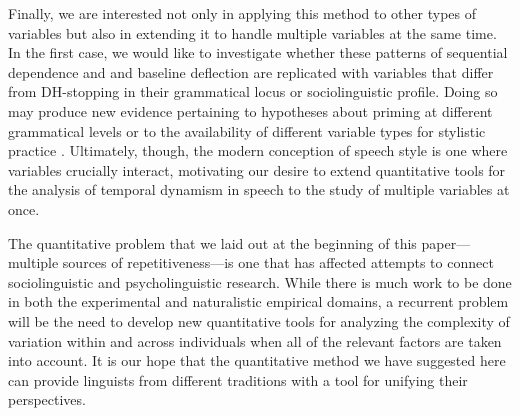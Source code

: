 \documentclass[12pt]{article}
\begin{document}
Finally, we are interested not only in applying this method to other types of variables but also in extending it to handle multiple variables at the same time. In the first case, we would like to investigate whether these patterns of sequential dependence and and baseline deflection are replicated with variables that differ from DH-stopping in their grammatical locus or sociolinguistic profile. Doing so may produce  new evidence pertaining to hypotheses about priming at different grammatical levels \citep{Tamminga:2014b} or to the availability of different variable types for stylistic practice \citep{Labov:1994}. Ultimately, though, the modern conception of speech style is one where variables crucially interact, motivating our desire to extend quantitative tools for the analysis of temporal dynamism in speech to the study of multiple variables at once.

The quantitative problem that we laid out at the beginning of this paper---multiple sources of repetitiveness---is one that has affected attempts to connect sociolinguistic and psycholinguistic research. While there is much work to be done in both the experimental and naturalistic empirical domains, a recurrent problem will be the need to develop new quantitative tools for analyzing the complexity of variation within and across individuals when all of the relevant factors are taken into account. It is our hope that the quantitative method we have suggested here can provide linguists from different traditions with a tool for unifying their perspectives.




\end{document}
